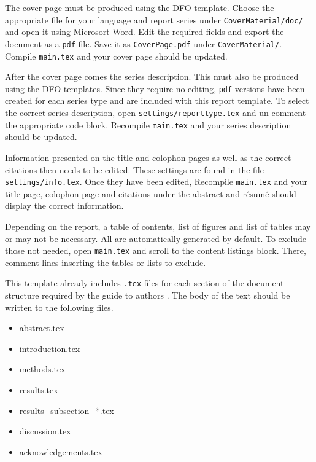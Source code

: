 

The cover page must be produced using the DFO template. Choose the appropriate file for your language and report series under \texttt{CoverMaterial/doc/} and open it using Microsort Word. Edit the required fields and export the document as a \texttt{pdf} file. Save it as \texttt{CoverPage.pdf} under \texttt{CoverMaterial/}. Compile \texttt{main.tex} and your cover page should be updated.


After the cover page comes the series description. This must also be produced using the DFO templates. Since they require no editing, \texttt{pdf} versions have been created for each series type and are included with this report template. To select the correct series description, open \texttt{settings/reporttype.tex} and un-comment the appropriate code block. Recompile \texttt{main.tex} and your series description should be updated.

Information presented on the title and colophon pages as well as the correct citations then needs to be edited. These settings are found in the file \texttt{settings/info.tex}. Once they have been edited, Recompile \texttt{main.tex} and your title page, colophon page and citations under the abstract and résumé should display the correct information.



Depending on the report, a table of contents, list of figures and list of tables may or may not be necessary. All are automatically generated by default. To exclude those not needed, open \texttt{main.tex} and scroll to the content listings block. There, comment lines inserting the tables or lists to exclude.


This template already includes \texttt{.tex} files for each section of the document structure required by the guide to authors \citep{GUIDE}. The body of the text should be written to the following files.

\begin{itemize}
    \item abstract.tex
    \item introduction.tex
    \item methods.tex
    \item results.tex
    \item results\_subsection\_*.tex
    \item discussion.tex
    \item acknowledgements.tex
\end{itemize}

